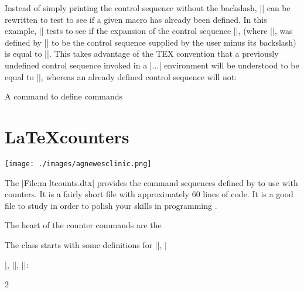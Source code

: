 Instead of simply printing the control sequence without
the backslash, |\newdef| can be rewritten to test to see
if a given macro has already been defined. In this example,
|\newdef| tests to see if the expansion of the control
sequence |\csname\one\endcsname|, (where |\one|,
was defined by |\stripbackslash| to be the control sequence
supplied by the user minus its backslash) is equal
to |\relax|. This takes advantage of the TEX convention
that a previously undefined control sequence invoked in
a |\csname...\endcsname| environment will be understood
to be equal to |\relax|, whereas an already defined
control sequence will not:

\begin{texexample}{A command to define commands}{}
\def\newdef#1{%
  \expandafter\stripbackslash\string#1*
  \expandafter
  \ifx\csname\one\endcsname\relax
  \else %
    {\tt Sorry, \string#1 has already been
     defined. Please supply a new name.}
\fi}
\end{texexample}


\chapter{\LaTeX counters}

\thispagestyle{plain}
{\centering\texttt{[image: ./images/agnewesclinic.png]}\par}

{\centering {}\par}


The |File:m ltcounts.dtx| provides the command sequences defined by \latex to use with counters. It is a fairly short file with approximately 
60 lines of code. It is a good file to study in order to polish your skills in programming \tex. 

The heart of the counter commands are the 

The class starts with some definitions for |\setcounter|, |\addtocounter|, |\newcounter|, |\value|:


\begin{teXXX}
2 \def\setcounter#1#2{%
3   \@ifundefined{c@#1}%
4      {\@nocounterr{#1}}%
5      {\global\csname c@#1\endcsname#2\relax}}
\end{teXXX}


